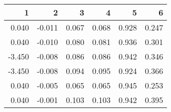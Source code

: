 \begin{table}[ht]
\centering
\begin{tabular}{rrrrrr}
  \hline
1 & 2 & 3 & 4 & 5 & 6 \\ 
  \hline
0.040 & -0.011 & 0.067 & 0.068 & 0.928 & 0.247 \\ 
  0.040 & -0.010 & 0.080 & 0.081 & 0.936 & 0.301 \\ 
  -3.450 & -0.008 & 0.086 & 0.086 & 0.942 & 0.346 \\ 
  -3.450 & -0.008 & 0.094 & 0.095 & 0.924 & 0.366 \\ 
  0.040 & -0.005 & 0.065 & 0.065 & 0.945 & 0.253 \\ 
  0.040 & -0.001 & 0.103 & 0.103 & 0.942 & 0.395 \\ 
   \hline
\end{tabular}
\end{table}
